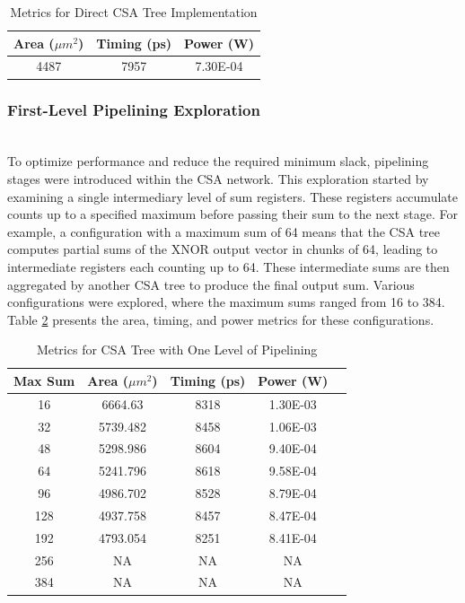 \documentclass[conference]{IEEEtran}
\newcounter{todocount}
\newcommand{\todo}[1]{
  \stepcounter{todocount}
}
\begin{document}
\begin{table}[h]
    \centering
    \caption{Metrics for Direct CSA Tree Implementation}
    \label{tab:direct_csa}
    \begin{tabular}{@{}ccc@{}}
        \toprule
        \textbf{Area ($\mu m^2$)} & \textbf{Timing (ps)} & \textbf{Power (W)} \\
        \midrule
          4487 & 7957 & 7.30E-04 \\
        \bottomrule
    \end{tabular}
\end{table}


\subsubsection{First-Level Pipelining Exploration}
\hfill\\

To optimize performance and reduce the required minimum slack, pipelining stages were introduced within the CSA network. This exploration started by examining a single intermediary level of sum registers. These registers accumulate counts up to a specified maximum before passing their sum to the next stage. For example, a configuration with a maximum sum of 64 means that the CSA tree computes partial sums of the XNOR output vector in chunks of 64, leading to intermediate registers each counting up to 64. These intermediate sums are then aggregated by another CSA tree to produce the final output sum. Various configurations were explored, where the maximum sums ranged from 16 to 384. Table \ref{tab:first_level} presents the area, timing, and power metrics for these configurations.

\todo{this NA}

\begin{table}[h]
    \centering
    \caption{Metrics for CSA Tree with One Level of Pipelining}
    \label{tab:first_level}
    \begin{tabular}{@{}ccccc@{}}
        \toprule
        \textbf{Max Sum} & \textbf{Area ($\mu m^2$)} & \textbf{Timing (ps)} & \textbf{Power (W)} \\
        \midrule
        16 & 6664.63 & 8318 & 1.30E-03 \\
        32 & 5739.482 & 8458 & 1.06E-03 \\
        48 & 5298.986 & 8604 & 9.40E-04 \\
        64 & 5241.796 & 8618 & 9.58E-04 \\
        96 & 4986.702 & 8528 & 8.79E-04 \\
        128 & 4937.758 & 8457 & 8.47E-04 \\
        192 & 4793.054 & 8251 & 8.41E-04 \\
        256 & NA & NA & NA \\
        384 & NA & NA & NA \\
        \bottomrule
    \end{tabular}
\end{table}
\end{document}
